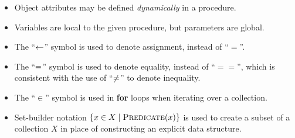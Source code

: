 \begin{itemize}
    \item Object attributes may be defined \emph{dynamically} in a procedure.
    \item Variables are local to the given procedure, but parameters are
    global.
    \item The ``$\leftarrow$'' symbol is used to denote assignment, instead of
    ``$=$''.
    \item The ``$=$'' symbol is used to denote equality, instead of
    ``$==$'', which is consistent with the use of ``$\neq$'' to denote
    inequality.
    \item The ``$\in$'' symbol is used in \textbf{for} loops when iterating
    over a collection.
    \item Set-builder notation $\{x \in X \mid \cPredicate[x]\}$ is used to
    create a subset of a collection $X$ in place of constructing an explicit
    data structure.
\end{itemize}